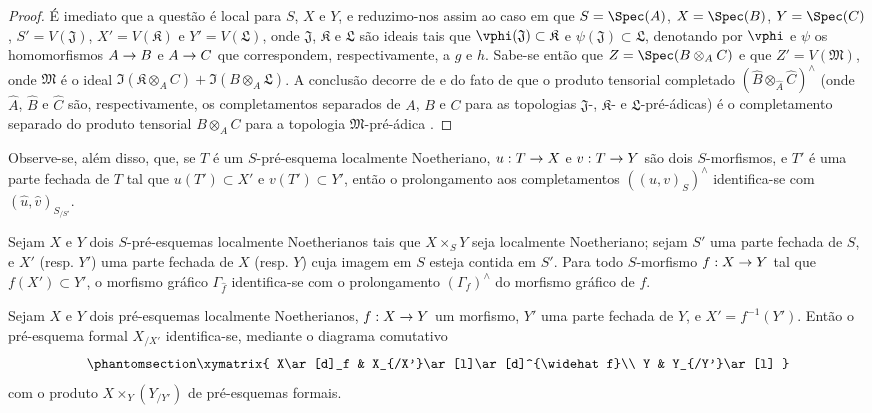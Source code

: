 \documentclass[oneside]{amsart}
\makeatletter
\newcommand{\ega@arrow}[2]{\mathchoice{#1}{#2}{#2}{#2}}
\renewcommand{\to}{\ega@arrow{\longrightarrow}{\rightarrow}}
\let\EGAOriginalLabel\label
\renewcommand{\label}[1]{\phantomsection\EGAOriginalLabel{#1}}
\makeatother
\begin{document}
\begin{proof}
É imediato que a questão é local para $S$, $X$ e $Y$, e reduzimo-nos assim ao caso em que $S=\Spec(A)$, $X=\Spec(B)$, $Y=\Spec(C)$, $S'=V(\mathfrak{J})$, $X'=V(\mathfrak{K})$ e $Y'=V(\mathfrak{L})$, onde $\mathfrak{J}$, $\mathfrak{K}$ e $\mathfrak{L}$ são ideais tais que $\vphi(\mathfrak{J})\subset\mathfrak{K}$ e $\psi(\mathfrak{J})\subset\mathfrak{L}$, denotando por $\vphi$ e $\psi$ os homomorfismos $A\to B$ e $A\to C$ que correspondem, respectivamente, a $g$ e $h$.
Sabe-se então que $Z=\Spec(B\otimes_A C)$ e que $Z'=V(\mathfrak{M})$, onde $\mathfrak{M}$ é o ideal $\Im(\mathfrak{K}\otimes_A C)+\Im(B\otimes_A\mathfrak{L})$.
A conclusão decorre de  e do fato de que o produto tensorial completado $(\widehat{B}\otimes_{\widehat{A}}\widehat{C})^\wedge$ (onde $\widehat{A}$, $\widehat{B}$ e $\widehat{C}$ são, respectivamente, os completamentos separados de $A$, $B$ e $C$ para as topologias $\mathfrak{J}$-, $\mathfrak{K}$- e $\mathfrak{L}$-pré-ádicas) é o completamento separado do produto tensorial $B\otimes_A C$ para a topologia $\mathfrak{M}$-pré-ádica .
\end{proof}

Observe-se, além disso, que, se $T$ é um $S$-pré-esquema localmente Noetheriano, $u:T\to X$ e $v:T\to Y$ são dois $S$-morfismos, e $T'$ é uma parte fechada de $T$ tal que $u(T')\subset X'$ e $v(T')\subset Y'$, então o prolongamento aos completamentos $((u,v)_S)^\wedge$ identifica-se com $(\widehat{u},\widehat{v})_{S_{/S'}}$.

\begin{corollary}[10.9.8]
\label{I.10.9.8}
Sejam $X$ e $Y$ dois $S$-pré-esquemas localmente Noetherianos tais que $X\times_S Y$ seja localmente Noetheriano; sejam $S'$ uma parte fechada de $S$, e $X'$ (resp. $Y'$) uma parte fechada de $X$ (resp. $Y$) cuja imagem em $S$ esteja contida em $S'$.
Para todo $S$-morfismo $f:X\to Y$ tal que $f(X')\subset Y'$, o morfismo gráfico $\Gamma_{\widehat f}$ identifica-se com o prolongamento $(\Gamma_f)^\wedge$ do morfismo gráfico de $f$.
\end{corollary}

\begin{corollary}[10.9.9]
\label{I.10.9.9}
Sejam $X$ e $Y$ dois pré-esquemas localmente Noetherianos, $f:X\to Y$ um morfismo, $Y'$ uma parte fechada de $Y$, e $X'=f^{-1}(Y')$.
Então o pré-esquema formal $X_{/X'}$ identifica-se, mediante o diagrama comutativo
\[
  \label{I.10.9.9.1}
  \xymatrix{
    X\ar[d]_f &
    X_{/X'}\ar[l]\ar[d]^{\widehat f}\\
    Y &
    Y_{/Y'}\ar[l]
  }
\]
com o produto $X\times_Y(Y_{/Y'})$ de pré-esquemas formais.
\end{corollary}
\end{document}
